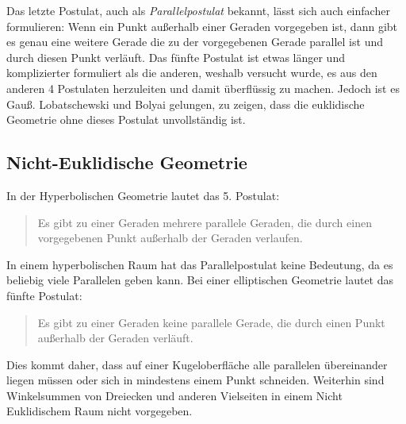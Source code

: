 \documentclass[a4paper]{article}
\begin{document}
Das letzte Postulat, auch als \textit{\glqq{}Parallelpostulat\grqq{}} bekannt, lässt sich auch einfacher formulieren: Wenn ein Punkt außerhalb einer Geraden vorgegeben ist, dann gibt es genau eine weitere Gerade die zu der vorgegebenen Gerade parallel ist und durch diesen Punkt verläuft. Das fünfte Postulat ist etwas länger und komplizierter formuliert als die anderen, weshalb versucht wurde, es aus den anderen 4 Postulaten herzuleiten und damit überflüssig zu machen. Jedoch ist es Gauß. Lobatschewski und Bolyai gelungen, zu zeigen, dass die euklidische Geometrie ohne dieses Postulat unvollständig ist.

\subsection{Nicht-Euklidische Geometrie}
In der Hyperbolischen Geometrie lautet das 5. Postulat:
\begin{quote}
Es gibt zu einer Geraden mehrere parallele Geraden, die durch einen vorgegebenen Punkt außerhalb der Geraden verlaufen.
\end{quote}
In einem hyperbolischen Raum hat das Parallelpostulat keine Bedeutung, da es beliebig viele Parallelen geben kann. Bei einer elliptischen Geometrie lautet das fünfte Postulat:
\begin{quote}
Es gibt zu einer Geraden keine parallele Gerade, die durch einen Punkt außerhalb der Geraden verläuft.
\end{quote}
Dies kommt daher, dass auf einer Kugeloberfläche alle parallelen übereinander liegen müssen oder sich in mindestens einem Punkt schneiden. Weiterhin sind Winkelsummen von Dreiecken und anderen Vielseiten in einem Nicht Euklidischem Raum nicht vorgegeben.
\end{document}
